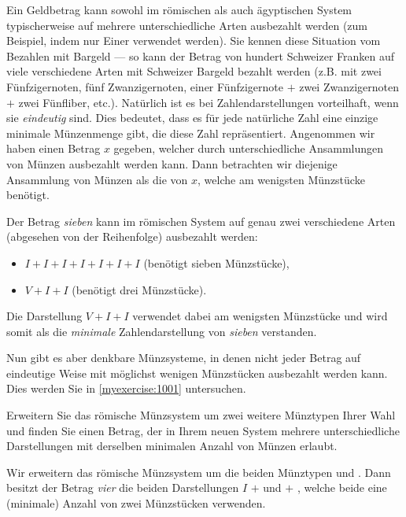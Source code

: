 Ein Geldbetrag kann sowohl im römischen als auch ägyptischen System typischerweise auf mehrere unterschiedliche Arten
ausbezahlt werden (zum Beispiel, indem nur Einer verwendet werden). Sie kennen diese Situation vom Bezahlen mit
Bargeld --- so kann der Betrag von hundert Schweizer Franken auf viele verschiedene Arten mit Schweizer Bargeld bezahlt werden
(z.B. mit zwei Fünfzigernoten, fünf Zwanzigernoten, einer Fünfzigernote $+$ zwei Zwanzigernoten $+$ zwei Fünfliber, etc.). Natürlich ist
es bei Zahlendarstellungen vorteilhaft, wenn sie \textit{eindeutig} sind. Dies bedeutet, dass es für jede natürliche Zahl eine einzige minimale Münzenmenge gibt, die diese Zahl repräsentiert. Angenommen wir haben einen Betrag $x$ gegeben, welcher durch
unterschiedliche Ansammlungen von Münzen ausbezahlt werden kann. Dann betrachten wir diejenige Ansammlung von Münzen als
die  von $x$, welche am wenigsten Münzstücke benötigt.

\begin{myexample}\label{myexample:not_unique}
  Der Betrag \textit{sieben} kann im römischen System auf genau zwei verschiedene Arten (abgesehen von der Reihenfolge) ausbezahlt werden:
  \begin{itemize}
    \item $I + I + I + I + I + I + I$ (benötigt sieben Münzstücke),
    \item $V + I + I$ (benötigt drei Münzstücke).
  \end{itemize}
  Die Darstellung $V + I + I$ verwendet dabei am wenigsten Münzstücke und wird somit als die \textit{minimale} Zahlendarstellung von
  \textit{sieben} verstanden.
\end{myexample}
Nun gibt es aber denkbare Münzsysteme, in denen nicht jeder Betrag auf eindeutige Weise mit möglichst wenigen
Münzstücken ausbezahlt werden kann. Dies werden Sie in \cref{myexercise:1001} untersuchen.

\begin{myexercise}\label{myexercise:1001}
  Erweitern Sie das römische Münzsystem um zwei weitere Münztypen Ihrer Wahl und finden Sie einen Betrag, der in Ihrem
  neuen System mehrere unterschiedliche Darstellungen mit derselben minimalen Anzahl von Münzen erlaubt.
  \begin{myanswer}
    Wir erweitern das römische Münzsystem um die beiden Münztypen  und . Dann besitzt der Betrag
    \textit{vier} die beiden Darstellungen $I$ $+$  und  $+$ , welche beide eine (minimale) Anzahl von zwei Münzstücken verwenden.
  \end{myanswer}
\end{myexercise}

